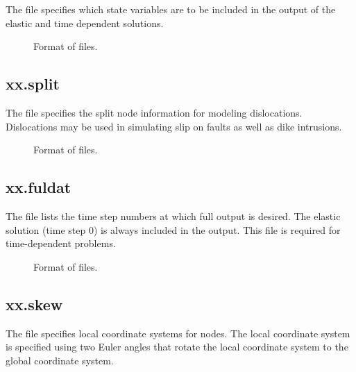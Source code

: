 The  file specifies which state variables are to
be included in the output of the elastic and time dependent solutions.

\begin{figure}[htbp]
  \begin{center}
    
    \caption{Format of  files.}
  \end{center}
\end{figure}


\subsection{xx.split}

The  file specifies the split node information for
modeling dislocations. Dislocations may be used in simulating slip on
faults as well as dike intrusions.

\begin{figure}[htbp]
  \begin{center}
    
    \caption{Format of  files.}
  \end{center}
\end{figure}

\subsection{xx.fuldat}

The  file lists the time step numbers at which
full output is desired. The elastic solution (time step 0) is always
included in the output. This file is required for time-dependent
problems.

\begin{figure}[htbp]
  \begin{center}
    
    \caption{Format of  files.}
  \end{center}
\end{figure}

\subsection{xx.skew}

The  file specifies local coordinate systems for
nodes. The local coordinate system is specified using two Euler angles
that rotate the local coordinate system to the global coordinate
system.

